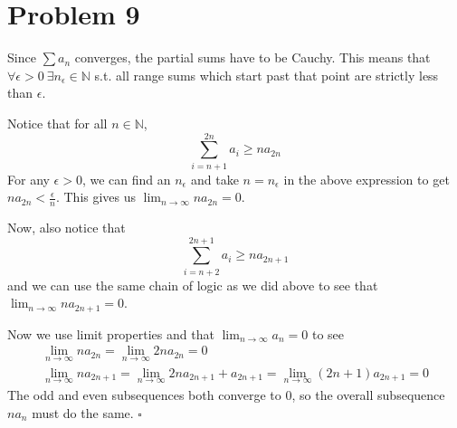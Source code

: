 \documentclass[12pt]{article}
\newcommand{\N}{\mathbb{N}}
\begin{document}
\section{Problem 9}

Since $\sum a_n$ converges, the partial sums have to be Cauchy.
This means that $\forall \epsilon > 0\ \exists n_\epsilon \in \N$
s.t. all range sums which start past that point are strictly less than $\epsilon$.

Notice that for all $n \in \N$,
\[\sum_{i=n+1}^{2n} a_i \ge na_{2n}\]
For any $\epsilon > 0$, we can find an $n_\epsilon$ and take $n=n_\epsilon$
in the above expression to get $na_{2n} < \frac{\epsilon}{n}$.
This gives us $\lim_{n \to \infty} na_{2n}=0$.

Now, also notice that
\[\sum_{i=n+2}^{2n+1} a_i \ge na_{2n+1}\]
and we can use the same chain of logic as we did above to see that $\lim_{n \to \infty} na_{2n+1}=0$.

Now we use limit properties and that $\lim_{n \to \infty} a_n=0$ to see
\begin{gather*}
  \lim_{n \to \infty} na_{2n} = \lim_{n \to \infty} 2na_{2n}=0 \\
  \lim_{n \to \infty} na_{2n+1}= \lim_{n \to \infty} 2na_{2n+1}+a_{2n+1}= \lim_{n \to \infty} (2n+1)a_{2n+1}=0
\end{gather*}
The odd and even subsequences both converge to $0$,
so the overall subsequence $na_n$ must do the same. $\square$
\end{document}
